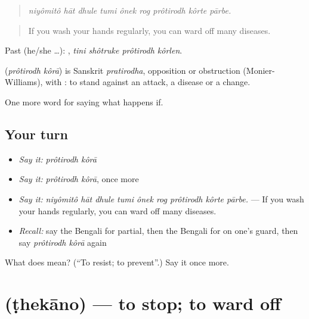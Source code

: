 \begin{quote}
\emph{niyômitô hāt dhule tumi ônek rog prôtirodh kôrte pārbe.}
\end{quote}

\begin{quote}
If you wash your hands regularly, you can ward off many diseases.
\end{quote}

Past (he/she …):    , \emph{tini shôtruke prôtirodh kôrlen}.

\begin{cousinweb}
\textbf{ } (\emph{prôtirodh kôrā}) is Sanskrit \emph{pratirodha}, opposition or obstruction (Monier-Williams), with : to stand against an attack, a disease or a change.
\end{cousinweb}

\begin{grammarlens}[title={What you've built}]
One more word for saying what happens if.
\end{grammarlens}

\subsection*{Your turn}
\begin{itemize}
\raggedright
  \item \emph{Say it:} \emph{prôtirodh kôrā}
  \item \emph{Say it:} \emph{prôtirodh kôrā}, once more
  \item \emph{Say it:} \emph{niyômitô hāt dhule tumi ônek rog prôtirodh kôrte pārbe.} — If you wash your hands regularly, you can ward off many diseases.
  \item \emph{Recall:} say the Bengali for partial, then the Bengali for on one's guard, then say \emph{prôtirodh kôrā} again
\end{itemize}

\begin{tcolorbox}[breakable,colback=teal!4,colframe=teal!35!black,title={Before you move on}]
What does   mean? (\textquotedblleft{}To resist; to prevent\textquotedblright{}.) Say it once more.
\end{tcolorbox}
\section[\texorpdfstring{\bn{ঠেকানো} (ṭhekāno)}{ঠেকানো (ṭhekāno)}]{ (ṭhekāno) — to stop; to ward off}

